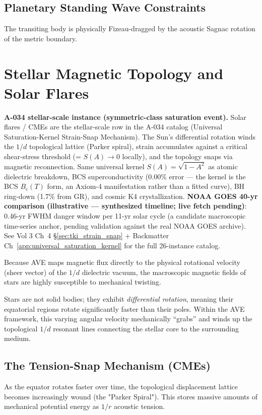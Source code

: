 \subsection{Planetary Standing Wave Constraints}
The transiting body is physically Fizeau-dragged by the acoustic Sagnac rotation of the metric boundary.

\section{Stellar Magnetic Topology and Solar Flares}

\textbf{A-034 stellar-scale instance (symmetric-class saturation event).}
Solar flares / CMEs are the stellar-scale row in the A-034 catalog
(Universal Saturation-Kernel Strain-Snap Mechanism). The Sun's differential
rotation winds the $1/d$ topological lattice (Parker spiral), strain
accumulates against a critical shear-stress threshold (= $S(A) \to 0$
locally), and the topology snaps via magnetic reconnection. Same universal
kernel $S(A) = \sqrt{1 - A^2}$ as atomic dielectric breakdown, BCS
superconductivity ($0.00\%$ error --- the kernel is the BCS $B_c(T)$ form, an Axiom-4 manifestation rather than a fitted curve), BH ring-down (1.7\% from GR), and
cosmic K4 crystallization. \textbf{NOAA GOES 40-yr comparison (illustrative --- synthesized timeline; live fetch pending)}:
0.46-yr FWHM danger window per 11-yr solar cycle (a candidate macroscopic
time-series anchor, pending validation against the real NOAA GOES archive). See Vol 3 Ch~4
\S\ref{sec:tki_strain_snap} + Backmatter Ch~\ref{app:universal_saturation_kernel}
for the full 26-instance catalog.

Because AVE maps magnetic flux directly to the physical rotational velocity (sheer vector) of the $1/d$ dielectric vacuum, the macroscopic magnetic fields of stars are highly susceptible to mechanical twisting.

Stars are not solid bodies; they exhibit \textit{differential rotation}, meaning their equatorial regions rotate significantly faster than their poles. Within the AVE framework, this varying angular velocity mechanically ``grabs'' and winds up the topological $1/d$ resonant lines connecting the stellar core to the surrounding medium.

\subsection{The Tension-Snap Mechanism (CMEs)}
As the equator rotates faster over time, the topological displacement lattice becomes increasingly wound (the "Parker Spiral"). This stores massive amounts of mechanical potential energy as $1/r$ acoustic tension. 

